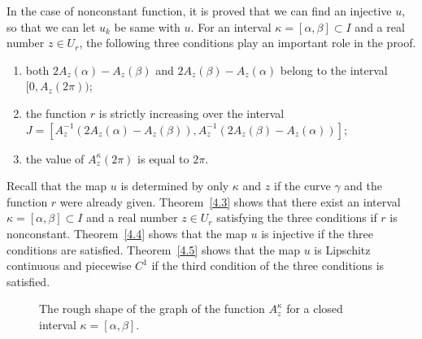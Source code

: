 \documentclass{amsart}
\theoremstyle{plain}
\theoremstyle{definition}
\theoremstyle{remark}
\begin{document}
In the case of nonconstant function, it is proved that we can find an injective $u$, so that we can let $u_k$ be same with $u$.
For an interval $\kappa=[\alpha,\beta]\subset I$ and a real number $z\in U_r$, the following three conditions play an important role in the proof.
\begin{enumerate}
\item both $2A_z(\alpha)-A_z(\beta)$ and $2A_z(\beta)-A_z(\alpha)$ belong to the interval $[0,A_z(2\pi))$;
\item the function $r$ is strictly increasing over the interval $J=[A_z^{-1}(2A_z(\alpha)-A_z(\beta)),A_z^{-1}(2A_z(\beta)-A_z(\alpha))]$;
\item the value of $A_z^{\kappa}(2\pi)$ is equal to $2\pi$.
\end{enumerate}
Recall that the map $u$ is determined by only $\kappa$ and $z$ if the curve $\gamma$ and the function $r$ were already given.
Theorem~\ref{4.3} shows that there exist an interval $\kappa=[\alpha,\beta]\subset I$ and a real number $z\in U_r$ satisfying the three conditions if $r$ is nonconstant.
Theorem~\ref{4.4} shows that the map $u$ is injective if the three conditions are satisfied.
Theorem~\ref{4.5} shows that the map $u$ is Lipschitz continuous and piecewise $C^1$ if the third condition of the three conditions is satisfied.



\begin{figure}[h]%
\caption{The rough shape of the graph of the function $A_z^{\kappa}$ for a closed interval $\kappa=[\alpha,\beta]$.}
\end{figure}
\end{document}
